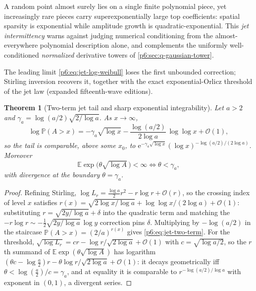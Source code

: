 \documentclass[11pt,oneside]{article}
\numberwithin{equation}{section}
\newtheorem{theorem}{Theorem}[section]
\theoremstyle{definition}
\theoremstyle{remark}
\newcommand{\E}{\mathbb E}
\newcommand{\Prob}{\mathbb P}
\newcommand{\e}{\mathrm e}
\newcommand{\bigO}{\mathcal O}
\begin{document}
A random point almost surely lies on a single finite polynomial piece, yet
increasingly rare pieces carry superexponentially large top coefficients:
spatial sparsity is exponential while amplitude growth is
quadratic-exponential.  This \emph{jet intermittency} warns against judging
numerical conditioning from the almost-everywhere polynomial description
alone, and complements the uniformly well-conditioned \emph{normalized}
derivative towers of \cref{p6:sec:q-gaussian-tower}.

The leading limit \eqref{p6:eq:jet-log-weibull} loses the first unbounded
correction; Stirling inversion recovers it, together with the exact
exponential-Orlicz threshold of the jet law (expanded fifteenth-wave
editions).

\begin{theorem}[Two-term jet tail and sharp exponential integrability]
\label{p6:thm:jet-two-term}
Let $a>2$ and $\gamma_a=\log(a/2)\sqrt{2/\log a}$.  As $x\to\infty$,
\begin{equation}\label{p6:eq:jet-two-term}
 \boxed{\ \log\Prob(A>x)
 =-\gamma_a\sqrt{\log x}
 -\frac{\log(a/2)}{2\log a}\,\log\log x+\bigO(1),\ }
\end{equation}
so the tail is comparable, above some $x_0$, to
$\e^{-\gamma_a\sqrt{\log x}}(\log x)^{-\log(a/2)/(2\log a)}$.  Moreover
\begin{equation}\label{p6:eq:jet-orlicz}
 \E\exp\bigl(\theta\sqrt{\log A}\,\bigr)<\infty
 \iff\theta<\gamma_a,
\end{equation}
with divergence at the boundary $\theta=\gamma_a$.
\end{theorem}

\begin{proof}
Refining Stirling,
$\log L_r=\tfrac{\log a}2r^2-r\log r+\bigO(r)$, so the crossing index of
level $x$ satisfies
$r(x)=\sqrt{2\log x/\log a}+\log\log x/(2\log a)+\bigO(1)$: substituting
$r=\sqrt{2y/\log a}+\delta$ into the quadratic term and matching the
$-r\log r\sim-\tfrac12\sqrt{2y/\log a}\,\log y$ correction pins
$\delta$.  Multiplying by $-\log(a/2)$ in the staircase
$\Prob(A>x)=(2/a)^{r(x)}$ gives \eqref{p6:eq:jet-two-term}.  For the
threshold, $\sqrt{\log L_r}=cr-\log r/\sqrt{2\log a}+\bigO(1)$ with
$c=\sqrt{\log a/2}$, so the $r$th summand of
$\E\exp(\theta\sqrt{\log A})$ has logarithm
$(\theta c-\log\tfrac a2)r-\theta\log r/\sqrt{2\log a}+\bigO(1)$: it
decays geometrically iff $\theta<\log(\tfrac a2)/c=\gamma_a$, and at
equality it is comparable to $r^{-\log(a/2)/\log a}$ with exponent in
$(0,1)$, a divergent series.
\end{proof}
\end{document}
